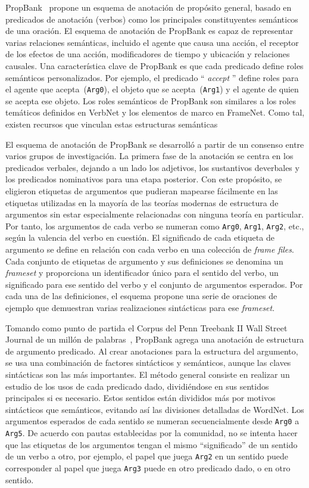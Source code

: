PropBank~\cite{propbank} propone un esquema de anotación de propósito general, basado en predicados de anotación (verbos) como los principales constituyentes semánticos de una oración.
El esquema de anotación de PropBank es capaz de representar varias relaciones semánticas, incluido el agente que causa una acción, el receptor de los efectos de una acción, modificadores de tiempo y ubicación y relaciones causales.
Una característica clave de PropBank es que cada predicado define roles semánticos personalizados.
Por ejemplo, el predicado `` \textit{accept} '' define roles para el agente que acepta~(\texttt{Arg0}), el objeto que se acepta~(\texttt{Arg1}) y el agente de quien se acepta ese objeto.
Los roles semánticos de PropBank son similares a los roles temáticos definidos en VerbNet y los elementos de marco en FrameNet. Como tal, existen recursos que vinculan estas estructuras semánticas~\cite{semlink}

El esquema de anotación de PropBank se desarrolló a partir de un consenso entre varios grupos de investigación.
La primera fase de la anotación se centra en los predicados verbales, dejando a un lado los adjetivos, los sustantivos deverbales y los predicados nominativos para una etapa posterior.
Con este propósito, se eligieron etiquetas de argumentos que pudieran mapearse fácilmente en las etiquetas utilizadas en la mayoría de las teorías modernas de estructura de argumentos sin estar especialmente relacionadas con ninguna teoría en particular.
Por tanto, los argumentos de cada verbo se numeran como \texttt{Arg0}, \texttt{Arg1}, \texttt{Arg2}, etc., según la valencia del verbo en cuestión.
El significado de cada etiqueta de argumento se define en relación con cada verbo en una colección de \textit{frame files}.
Cada conjunto de etiquetas de argumento y sus definiciones se denomina un \textit{frameset} y proporciona un identificador único para el sentido del verbo, un significado para ese sentido del verbo y el conjunto de argumentos esperados.
Por cada una de las definiciones, el esquema propone una serie de oraciones de ejemplo que demuestran varias realizaciones sintácticas para ese \textit{frameset}.

Tomando como punto de partida el Corpus del Penn Treebank II Wall Street Journal de un millón de palabras~\cite{Marcus1994}, PropBank agrega una anotación de estructura de argumento predicado.
Al crear anotaciones para la estructura del argumento, se usa una combinación de factores sintácticos y semánticos, aunque las claves sintácticas son las más importantes.
El método general consiste en realizar un estudio de los usos de cada predicado dado, dividiéndose en sus sentidos principales si es necesario.
Estos sentidos están divididos más por motivos sintácticos que semánticos, evitando así las divisiones detalladas de WordNet.
Los argumentos esperados de cada sentido se numeran secuencialmente desde \texttt{Arg0} a \texttt{Arg5}.
De acuerdo con pautas establecidas por la comunidad, no se intenta hacer que las etiquetas de los argumentos tengan el mismo ``significado'' de un sentido de un verbo a otro, por ejemplo, el papel que juega \texttt{Arg2} en un sentido puede corresponder al papel que juega \texttt{Arg3} puede en otro predicado dado, o en otro sentido.


